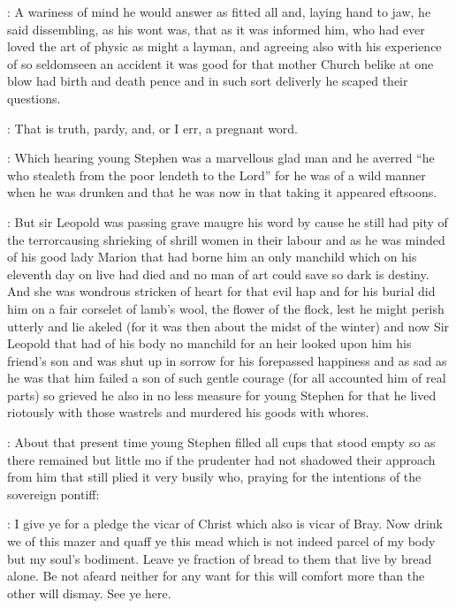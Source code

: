 : A wariness of mind he would answer as fitted all and, laying hand to
jaw, he said dissembling, as his wont was, that as it was informed him,
who had ever loved the art of physic as might a layman, and agreeing also
with his experience of so seldomseen an accident it was good for that
mother Church belike at one blow had birth and death pence and in such
sort deliverly he scaped their questions.

\dixon: That is truth, pardy, and, or I err, a pregnant word.

: Which hearing young Stephen was a marvellous glad man and he averred
“he who stealeth from the poor lendeth to the Lord” for he was of a wild
manner when he was drunken and that he was now in that taking it appeared
eftsoons.


: But sir Leopold was passing grave maugre his word by cause he still
had pity of the terrorcausing shrieking of shrill women in their labour
and as he was minded of his good lady Marion that had borne him an only
manchild which on his eleventh day on live had died and no man of art
could save so dark is destiny. And she was wondrous stricken of heart for
that evil hap and for his burial did him on a fair corselet of lamb's
wool, the flower of the flock, lest he might perish utterly and lie
akeled (for it was then about the midst of the winter) and now Sir
Leopold that had of his body no manchild for an heir looked upon him his
friend's son and was shut up in sorrow for his forepassed happiness and
as sad as he was that him failed a son of such gentle courage (for all
accounted him of real parts) so grieved he also in no less measure for
young Stephen for that he lived riotously with those wastrels and
murdered his goods with whores.



: About that present time young Stephen filled all cups that stood
empty so as there remained but little mo if the prudenter had not shadowed
their approach from him that still plied it very busily who, praying for
the intentions of the sovereign pontiff:

\stephen: I give ye for a pledge the vicar of Christ which also is vicar of
Bray. Now drink we of this mazer and quaff ye this mead which is not
indeed parcel of my body but my soul's bodiment. Leave ye fraction of
bread to them that live by bread alone. Be not afeard neither for any want
for this will comfort more than the other will dismay. See ye here.

